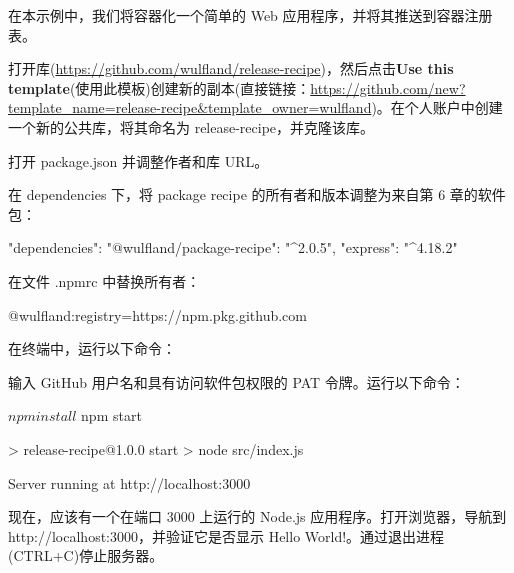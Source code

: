 在本示例中，我们将容器化一个简单的 Web 应用程序，并将其推送到容器注册表。


打开库(\url{https://github.com/wulfland/release-recipe})，然后点击\textbf{Use
this template}(使用此模板)创建新的副本(直接链接：\url{https://github.com/new?template_name=release-recipe&template_owner=wulfland})。在个人账户中创建一个新的公共库，将其命名为 release-recipe，并克隆该库。

打开 package.json 并调整作者和库 URL。

在 dependencies 下，将 package recipe 的所有者和版本调整为来自第 6 章的软件包：

\begin{shell}
"dependencies": {
  "@wulfland/package-recipe": "^2.0.5",
  "express": "^4.18.2"
}
\end{shell}

在文件 .npmrc 中替换所有者：

\begin{shell}
@wulfland:registry=https://npm.pkg.github.com
\end{shell}

在终端中，运行以下命令：


输入 GitHub 用户名和具有访问软件包权限的 PAT 令牌。运行以下命令：

\begin{shell}
$ npm install
$ npm start

> release-recipe@1.0.0 start
> node src/index.js

Server running at http://localhost:3000
\end{shell}

现在，应该有一个在端口 3000 上运行的 Node.js 应用程序。打开浏览器，导航到 http://localhost:3000，并验证它是否显示 Hello World!。通过退出进程(CTRL+C)停止服务器。


